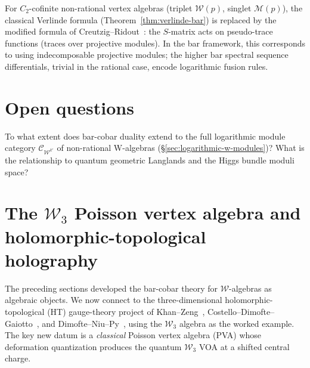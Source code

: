 \begin{remark}
\label{rem:modified-verlinde}
For $C_2$-cofinite non-rational vertex algebras (triplet $\mathcal{W}(p)$, singlet $\mathcal{M}(p)$), the classical Verlinde formula (Theorem~\ref{thm:verlinde-bar}) is replaced by the modified formula of Creutzig--Ridout~\cite{CreutzigRidout2013}: the $S$-matrix acts on pseudo-trace functions (traces over projective modules).  In the bar framework, this corresponds to using indecomposable projective modules; the higher bar spectral sequence differentials, trivial in the rational case, encode logarithmic fusion rules.
\end{remark}

\section{Open questions}

\begin{question}
\label{q:log-w-koszul}
To what extent does bar-cobar duality extend to the full logarithmic module category $\mathcal{C}_{\mathcal{W}^{k'}}$ of non-rational W-algebras (\S\ref{sec:logarithmic-w-modules})?
What is the relationship to quantum geometric Langlands and the Higgs bundle moduli space?
\end{question}

\section{The \texorpdfstring{$\mathcal{W}_3$}{W3} Poisson vertex algebra and holomorphic-topological holography}
\label{sec:w3-pva-holography}

The preceding sections developed the bar-cobar theory for $\mathcal{W}$-algebras
as algebraic objects.  We now connect to the three-dimensional
holomorphic-topological (HT) gauge-theory project of
Khan--Zeng~\cite{KhanZeng25}, Costello--Dimofte--Gaiotto~\cite{CDG20}, and
Dimofte--Niu--Py~\cite{DNP25}, using the $\mathcal{W}_3$ algebra as the
worked example.  The key new datum is a \emph{classical} Poisson vertex
algebra (PVA) whose deformation quantization produces the quantum
$\mathcal{W}_3$ VOA at a shifted central charge.

